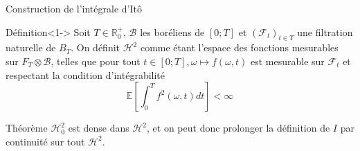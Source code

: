 \documentclass{beamer}
\newcommand{\1}{\mathmybb{1}}
\begin{document}
     \begin{frame}{Construction de l'intégrale d'Itô}
   \begin{block}{Définition}<1->
     Soit $T \in \mathbb{R}^{+}_{0}$, $\mathcal{B}$ les boréliens de $\left[0; T  \right]$ et $\left( \mathcal{F}_{t} \right)_{t\in T}$ une filtration naturelle de $B_{T}$.
     On définit $\mathcal{H}^{2}$ comme étant l'espace des fonctions mesurables sur $F_{T} \otimes \mathcal{B}$, telles que pour tout $ t \in \left[0; T  \right], \omega \mapsto f(\omega, t)$ est mesurable sur $\mathcal{F}_{t}$ et respectant la condition d'intégrabilité \\
     \[
       \mathbb{E}\left[\int_{0}^{T}f^{2}(\omega, t) dt \right] < \infty
     \]
   \end{block}
   \pause
   \begin{block}{Théorème}
     $\mathcal{H}^{2}_{0}$ est dense dans $ \mathcal{H}^{2}$, et on peut donc prolonger la définition de $I$ par continuité sur tout $\mathcal{H}^{2}$.
   \end{block}
 \end{frame}
\end{document}

